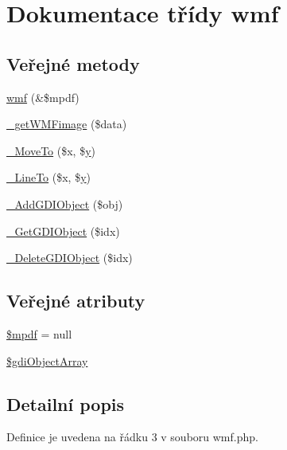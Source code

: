 \hypertarget{classwmf}{\section{Dokumentace třídy wmf}
\label{classwmf}
}
\subsection*{Veřejné metody}
\begin{DoxyCompactItemize}
\item 
\hyperlink{classwmf_a2ef59be7e03ea88621cebb5e46746b17}{wmf} (\&\$mpdf)
\item 
\hyperlink{classwmf_a4624fc4b76f6f5d77b1cbe79cb257df8}{\-\_\-get\-W\-M\-Fimage} (\$data)
\item 
\hyperlink{classwmf_afc82518049a5842ffaa2d48aa96dc851}{\-\_\-\-Move\-To} (\$x, \$\hyperlink{example43___m_p_d_f_i__booklet_8php_a3f83be162d14f38451e1bc419fbbbcbc}{y})
\item 
\hyperlink{classwmf_a38c3e240c7dd68a0bed76809aae56c5f}{\-\_\-\-Line\-To} (\$x, \$\hyperlink{example43___m_p_d_f_i__booklet_8php_a3f83be162d14f38451e1bc419fbbbcbc}{y})
\item 
\hyperlink{classwmf_a81d97d9365525f9a49d8f4471facb632}{\-\_\-\-Add\-G\-D\-I\-Object} (\$obj)
\item 
\hyperlink{classwmf_a9b9c8184d1f3204bc308044cbca996ad}{\-\_\-\-Get\-G\-D\-I\-Object} (\$idx)
\item 
\hyperlink{classwmf_a5b554704c97f6d3f4c6db6e5ad8b2860}{\-\_\-\-Delete\-G\-D\-I\-Object} (\$idx)
\end{DoxyCompactItemize}
\subsection*{Veřejné atributy}
\begin{DoxyCompactItemize}
\item 
\hyperlink{classwmf_a7963d880f70390c18931e1eec448efd3}{\$mpdf} = null
\item 
\hyperlink{classwmf_a2a0cd093f6daf9bf74efacb4d8e0ea26}{\$gdi\-Object\-Array}
\end{DoxyCompactItemize}


\subsection{Detailní popis}


Definice je uvedena na řádku 3 v souboru wmf.\-php.




